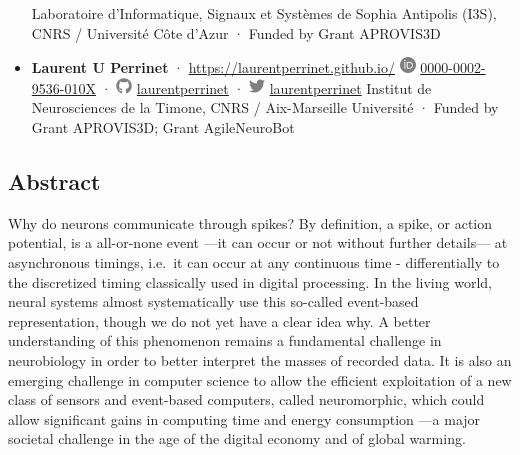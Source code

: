 \begin{itemize}
  Laboratoire d'Informatique, Signaux et Systèmes de Sophia Antipolis (I3S), CNRS / Université Côte d'Azur
  · Funded by Grant APROVIS3D
\item
  \textbf{Laurent U Perrinet}
  · \url{https://laurentperrinet.github.io/}
  \includegraphics[width=0.16667in,height=0.16667in]{images/orcid.svg}
  \href{https://orcid.org/0000-0002-9536-010X}{0000-0002-9536-010X}
  · \includegraphics[width=0.16667in,height=0.16667in]{images/github.svg}
  \href{https://github.com/laurentperrinet}{laurentperrinet}
  · \includegraphics[width=0.16667in,height=0.16667in]{images/twitter.svg}
  \href{https://twitter.com/laurentperrinet}{laurentperrinet}
  Institut de Neurosciences de la Timone, CNRS / Aix-Marseille Université
  · Funded by Grant APROVIS3D; Grant AgileNeuroBot
\end{itemize}

\hypertarget{abstract}{%
\subsection{Abstract}\label{abstract}}

Why do neurons communicate through spikes? By definition, a spike, or action potential, is a all-or-none event ---it can occur or not without further details--- at asynchronous timings, i.e.~it can occur at any continuous time - differentially to the discretized timing classically used in digital processing. In the living world, neural systems almost systematically use this so-called event-based representation, though we do not yet have a clear idea why. A better understanding of this phenomenon remains a fundamental challenge in neurobiology in order to better interpret the masses of recorded data. It is also an emerging challenge in computer science to allow the efficient exploitation of a new class of sensors and event-based computers, called neuromorphic, which could allow significant gains in computing time and energy consumption ---a major societal challenge in the age of the digital economy and of global warming.

